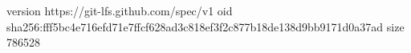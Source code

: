 version https://git-lfs.github.com/spec/v1
oid sha256:fff5bc4e716efd71e7ffcf628ad3c818ef3f2c877b18de138d9bb9171d0a37ad
size 786528
